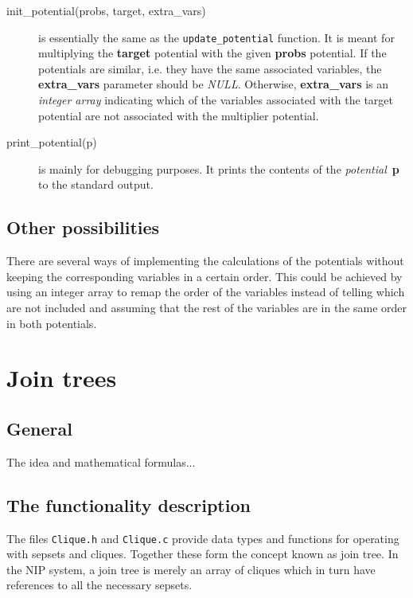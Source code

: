 \documentclass[12pt,a4paper]{report}
\newcommand{\cdatatype}[1]{{\it #1}}
\newcommand{\cfilename}[1]{\texttt{#1}}
\newcommand{\cparameter}[1]{\textbf{#1}}
\newcommand{\cfunction}[1]{\texttt{#1}}
\begin{document}
\begin{description}
\item[init\_potential(probs, target, extra\_vars)] is essentially the
same as the \cfunction{update\_potential} function. It is meant for
multiplying the \cparameter{target} potential with the given
\cparameter{probs} potential. If the potentials are similar, i.e. they
have the same associated variables, the \cparameter{extra\_vars} parameter 
should be \cdatatype{NULL}. Otherwise, \cparameter{extra\_vars} is an 
\cdatatype{integer array} indicating which of the variables associated 
with the target potential are not associated with the multiplier potential.

\item[print\_potential(p)] is mainly for debugging purposes. It prints 
the contents of the \cdatatype{potential}~\cparameter{p} to the 
standard output.
\end{description}


\subsection{Other possibilities}
There are several ways of implementing the calculations of the potentials
without keeping the corresponding variables in a certain order. This
could be achieved by using an integer array to remap the order of the
variables instead of telling which are not included and assuming that
the rest of the variables are in the same order in both potentials.


\newpage
\section{Join trees} %
\subsection{General}

The idea and mathematical formulas...

\subsection{The functionality description}
The files \cfilename{Clique.h} and \cfilename{Clique.c} provide data 
types and functions for operating with sepsets and cliques. Together 
these form the concept known as join tree. In the NIP system, a join 
tree is merely an array of cliques which in turn have references to
all the necessary sepsets.
\end{document}
